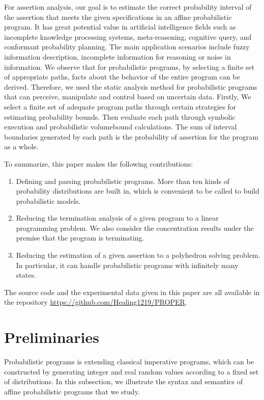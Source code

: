 \documentclass[runningheads]{llncs}
\begin{document}
For assertion analysis, our goal is to estimate the correct probability interval of the assertion that meets the given specifications in an affine probabilistic program. It has great potential value in artificial intelligence fields such as incomplete knowledge processing systems, meta-reasoning, cognitive query, and conformant probability planning. The main application scenarios include fuzzy information description, incomplete information for reasoning or noise in information. We observe that for probabilistic programs, by selecting a finite set of appropriate paths, facts about the behavior of the entire program can be derived. Therefore, we used the static analysis method for probabilistic programs that can perceive, manipulate and control based on uncertain data. Firstly, We select a finite set of adequate program paths through certain strategies for estimating probability bounds. Then evaluate each path through symbolic execution and probabilistic volumebound calculations. The sum of interval boundaries generated by each path is the probability of assertion for the program as a whole.

To summarize, this paper makes the following contributions:
\begin{enumerate}
	\item Defining and parsing probabilistic programs. More than ten kinds of probability distributions are built in, which is convenient to be called to build probabilistic models.
	\item Reducing the termination analysis of a given program to a linear programming problem. We also consider the concentration results under the premise that the program is terminating.
	\item Reducing the estimation of a given assertion to a polyhedron solving problem. In particular, it can handle probabilistic programs with infinitely many states.	
\end{enumerate}

The source code and the experimental data given in this paper are all available in the repository \url{https://github.com/Healing1219/PROPER}.

\section{Preliminaries}
Probabilistic programs is extending classical imperative programs, which can be constructed by generating integer and real random values according to a fixed set of distributions. In this subsection, we illustrate the syntax and semantics of affine probabilistic programs that we study.
\end{document}
